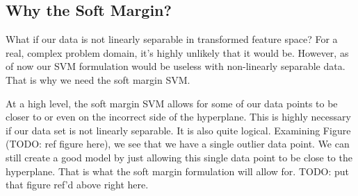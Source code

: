 \subsection{Why the Soft Margin?}
What if our data is not linearly separable in transformed feature space? For a real, complex problem domain, it's highly unlikely that it would be. However, as of now our SVM formulation would be useless with non-linearly separable data. That is why we need the soft margin SVM.

At a high level, the soft margin SVM allows for some of our data points to be closer to or even on the incorrect side of the hyperplane. This is highly necessary if our data set is not linearly separable. It is also quite logical. Examining Figure (TODO: ref figure here), we see that we have a single outlier data point. We can still create a good model by just allowing this single data point to be close to the hyperplane. That is what the soft margin formulation will allow for.
TODO: put that figure ref'd above right here.

